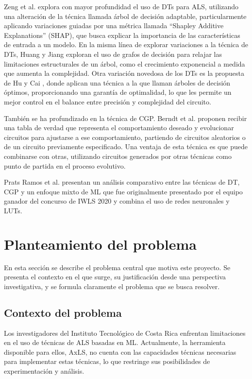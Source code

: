 Zeng et al. \cite{zeng_sampling-based_2021} explora con mayor profundidad el
uso de DTs para ALS, utilizando una alteración de la técnica llamada árbol de
decisión adaptable, particularmente aplicando variaciones guiadas por una
métrica llamada ``Shapley Additive Explanations'' (SHAP), que busca explicar la
importancia de las características de entrada a un modelo. En la misma línea de
explorar variaciones a la técnica de DTs, Huang y Jiang
\cite{huang_circuit_2023} exploran el uso de grafos de decisión para relajar
las limitaciones estructurales de un árbol, como el crecimiento exponencial a
medida que aumenta la complejidad. Otra variación novedosa de los DTs es la
propuesta de Hu y Cai \cite{hu_optdtals_2024}, donde aplican una técnica a la
que llaman árboles de decisión óptimos, proporcionando una garantía de
optimalidad, lo que les permite un mejor control en el balance entre precisión
y complejidad del circuito.

También se ha profundizado en la técnica de CGP. Berndt et al.
\cite{berndt_cgp-based_2022} proponen recibir una tabla de verdad que
representa el comportamiento deseado y evolucionar circuitos para ajustarse a
ese comportamiento, partiendo de circuitos aleatorios o de un circuito
previamente especificado. Una ventaja de esta técnica es que puede combinarse
con otras, utilizando circuitos generados por otras técnicas como punto de
partida en el proceso evolutivo.

Prats Ramos et al. \cite{prats_ramos_impact_2024} presentan un análisis
comparativo entre las técnicas de DT, CGP y un enfoque mixto de ML que fue
originalmente presentado por el equipo ganador del concurso de IWLS 2020
\cite{rai_logic_2021} y combina el uso de redes neuronales y LUTs.

\section{Planteamiento del problema}

En esta sección se describe el problema central que motiva este proyecto. Se
presenta el contexto en el que surge, su justificación desde una perspectiva
investigativa, y se formula claramente el problema que se busca resolver.

\subsection{Contexto del problema}

Los investigadores del Instituto Tecnológico de Costa Rica enfrentan
limitaciones en el uso de técnicas de ALS basadas en ML. Actualmente, la
herramienta disponible para ellos, AxLS, no cuenta con las capacidades técnicas
necesarias para implementar estas técnicas, lo que restringe sus posibilidades
de experimentación y análisis.


